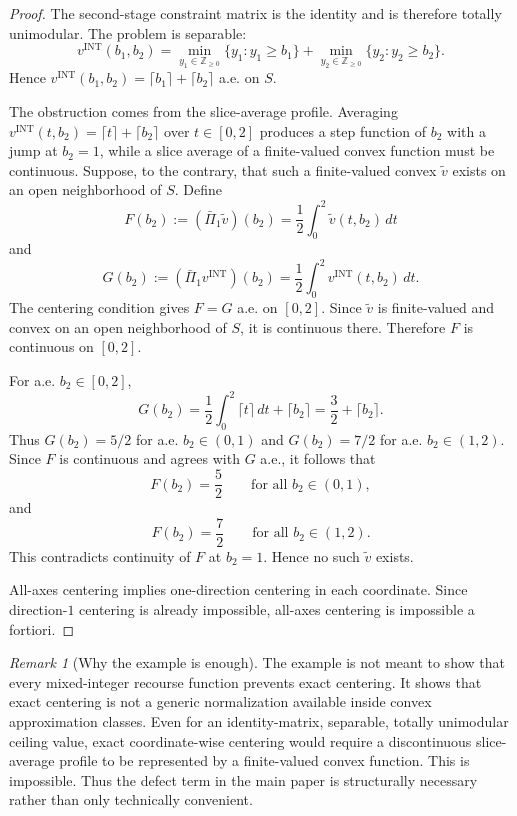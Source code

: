 \documentclass[11pt,letterpaper]{article}
\theoremstyle{definition}
\theoremstyle{remark}
\newtheorem{remark}[theorem]{Remark}
\newcommand{\INT}{\mathrm{INT}}
\begin{document}
\begin{proof}
The second-stage constraint matrix is the identity and is therefore totally
unimodular. The problem is separable:
$$
v^{\INT}(b_1,b_2)
=
\min_{y_1\in\mathbb Z_{\ge0}}\{y_1:y_1\ge b_1\}
+
\min_{y_2\in\mathbb Z_{\ge0}}\{y_2:y_2\ge b_2\}.
$$
Hence $v^{\INT}(b_1,b_2)=\lceil b_1\rceil+\lceil b_2\rceil$ a.e. on $S$.

The obstruction comes from the slice-average profile. Averaging
$v^{\INT}(t,b_2)=\lceil t\rceil+\lceil b_2\rceil$ over $t\in[0,2]$ produces a
step function of $b_2$ with a jump at $b_2=1$, while a slice average of a
finite-valued convex function must be continuous.
Suppose, to the contrary, that such a finite-valued convex $\widetilde v$
exists on an open neighborhood of $S$. Define
$$
F(b_2):=(\bar\Pi_1\widetilde v)(b_2)
=
\frac12\int_0^2\widetilde v(t,b_2)\,dt
$$
and
$$
G(b_2):=(\bar\Pi_1v^{\INT})(b_2)
=
\frac12\int_0^2v^{\INT}(t,b_2)\,dt.
$$
The centering condition gives $F=G$ a.e. on $[0,2]$. Since
$\widetilde v$ is finite-valued and convex on an open neighborhood of $S$, it
is continuous there. Therefore $F$ is continuous on $[0,2]$.

For a.e. $b_2\in[0,2]$,
$$
G(b_2)
=
\frac12\int_0^2\lceil t\rceil\,dt+\lceil b_2\rceil
=
\frac32+\lceil b_2\rceil .
$$
Thus $G(b_2)=5/2$ for a.e. $b_2\in(0,1)$ and
$G(b_2)=7/2$ for a.e. $b_2\in(1,2)$. Since $F$ is continuous and agrees with
$G$ a.e., it follows that
$$
F(b_2)=\frac52
\qquad
\text{for all } b_2\in(0,1),
$$
and
$$
F(b_2)=\frac72
\qquad
\text{for all } b_2\in(1,2).
$$
This contradicts continuity of $F$ at $b_2=1$. Hence no such
$\widetilde v$ exists.

All-axes centering implies one-direction centering in each coordinate. Since
direction-$1$ centering is already impossible, all-axes centering is impossible
a fortiori.
\end{proof}
\begin{remark}[Why the example is enough]
\label{rem:tu_obstruction_interpretation}
The example is not meant to show that every mixed-integer recourse function
prevents exact centering. It shows that exact centering is not a generic
normalization available inside convex approximation classes. Even for an
identity-matrix, separable, totally unimodular ceiling value, exact
coordinate-wise centering would require a discontinuous slice-average profile
to be represented by a finite-valued convex function. This is impossible.
Thus the defect term in the main paper is structurally necessary rather than
only technically convenient.
\end{remark}
\end{document}
